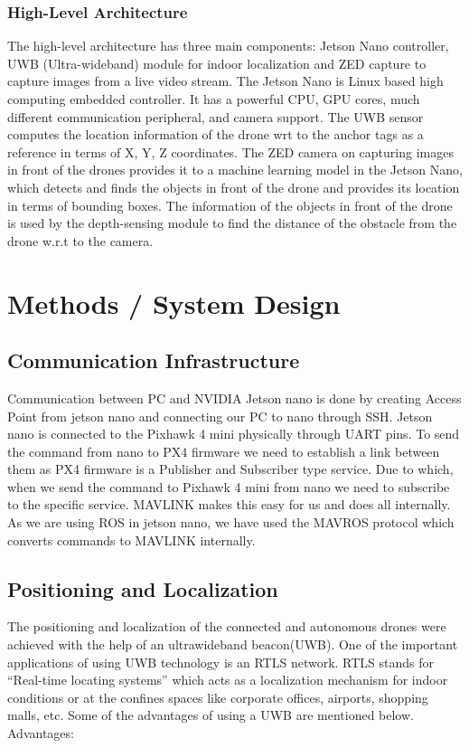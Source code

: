 \documentclass{IEEEtran}
\begin{document}
\subsubsection{High-Level Architecture}
The high-level architecture has three main components: Jetson Nano controller, UWB (Ultra-wideband) module for indoor localization and ZED capture to capture images from a live video stream. The Jetson Nano is Linux based high computing embedded controller. It has a powerful CPU, GPU cores, much different communication peripheral, and camera support. The UWB sensor computes the location information of the drone wrt to the anchor tags as a reference in terms of X, Y, Z coordinates. The ZED camera on capturing images in front of the drones provides it to a machine learning model in the Jetson Nano, which detects and finds the objects in front of the drone and provides its location in terms of bounding boxes. The information of the objects in front of the drone is used by the depth-sensing module to find the distance of the obstacle from the drone w.r.t to the camera.

\section{Methods / System Design}\label{sec:methods}

\subsection{Communication Infrastructure}
Communication between PC and NVIDIA Jetson nano is done by creating Access Point from jetson nano and connecting our PC to nano through SSH. 
\newline Jetson nano is connected to the Pixhawk 4 mini physically through UART pins. To send the command from nano to PX4 firmware we need to establish a link between them as PX4 firmware is a Publisher and Subscriber type service. Due to which, when we send the command to Pixhawk 4 mini from nano we need to subscribe to the specific service. MAVLINK makes this easy for us and does all internally. As we are using ROS in jetson nano, we have used the MAVROS protocol which converts commands to MAVLINK internally.

\subsection{Positioning and Localization}
The positioning and localization of the connected and autonomous drones were achieved with the help of an ultrawideband beacon(UWB). One of the important applications of using UWB technology is an RTLS network. RTLS stands for “Real-time locating systems” which acts as a localization mechanism for indoor conditions or at the confines spaces like corporate offices, airports, shopping malls, etc. Some of the advantages of using a UWB are mentioned below.
\newline Advantages:
\end{document}
